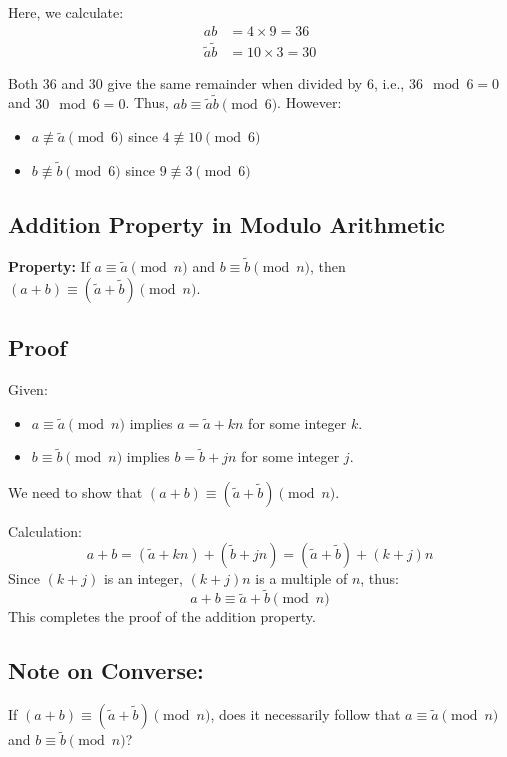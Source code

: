 \documentclass{article}
\begin{document}
Here, we calculate:
\begin{align*}
ab &= 4 \times 9 = 36 \\
\tilde{a}\tilde{b} &= 10 \times 3 = 30
\end{align*}

Both \( 36 \) and \( 30 \) give the same remainder when divided by 6, i.e., \( 36 \mod 6 = 0 \) and \( 30 \mod 6 = 0 \). Thus, \( ab \equiv \tilde{a}\tilde{b} \pmod{6} \). However:
\begin{itemize}
    \item \( a \not\equiv \tilde{a} \pmod{6} \) since \( 4 \not\equiv 10 \pmod{6} \)
    \item \( b \not\equiv \tilde{b} \pmod{6} \) since \( 9 \not\equiv 3 \pmod{6} \)
\end{itemize}

\subsection*{Addition Property in Modulo Arithmetic}

\textbf{Property:} If \( a \equiv \tilde{a} \pmod{n} \) and \( b \equiv \tilde{b} \pmod{n} \), then \( (a + b) \equiv (\tilde{a} + \tilde{b}) \pmod{n} \).

\subsection*{Proof}
Given:
\begin{itemize}
    \item \( a \equiv \tilde{a} \pmod{n} \) implies \( a = \tilde{a} + kn \) for some integer \( k \).
    \item \( b \equiv \tilde{b} \pmod{n} \) implies \( b = \tilde{b} + jn \) for some integer \( j \).
\end{itemize}

We need to show that \( (a + b) \equiv (\tilde{a} + \tilde{b}) \pmod{n} \).

Calculation:
\[
a + b = (\tilde{a} + kn) + (\tilde{b} + jn) = (\tilde{a} + \tilde{b}) + (k + j)n
\]
Since \( (k + j) \) is an integer, \( (k + j)n \) is a multiple of \( n \), thus:
\[
a + b \equiv \tilde{a} + \tilde{b} \pmod{n}
\]
This completes the proof of the addition property.

\subsection*{Note on Converse:} If \( (a + b) \equiv (\tilde{a} + \tilde{b}) \pmod{n} \), does it necessarily follow that \( a \equiv \tilde{a} \pmod{n} \) and \( b \equiv \tilde{b} \pmod{n} \)?
\end{document}
